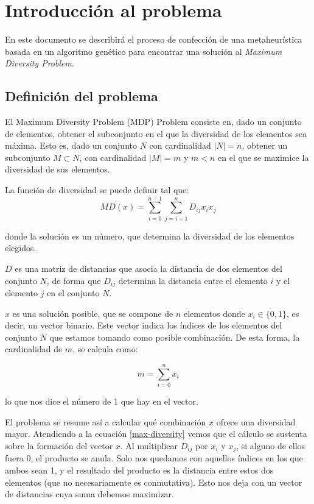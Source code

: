 \chapter{Introducción al problema}

En este documento se describirá el proceso de confección de una metaheurística basada en un algoritmo genético para encontrar una solución al \textit{Maximum Diversity Problem}.

\section{Definición del problema}
El Maximum Diversity Problem (MDP) Problem consiste en, dado un conjunto de elementos, obtener el subconjunto en el que la diversidad de los elementos sea máxima. Esto es, dado un conjunto $N$ con cardinalidad $|N| = n$, obtener un subconjunto $M \subset N$, con cardinalidad $|M| = m$ y $m < n$ en el que se maximice la diversidad de sus elementos.

La función de diversidad se puede definir tal que:
\begin{equation}
    MD(x) = \sum^{n-1}_{i=0} \sum^{n}_{j=i+1} D_{ij}x_ix_j
\label{max-diversity}
\end{equation}

donde la solución es un número, que determina la diversidad de los elementos elegidos.

$D$ es una matriz de distancias que asocia la distancia de dos elementos del conjunto $N$, de forma que $D_{ij}$ determina la distancia entre el elemento $i$ y el elemento $j$ en el conjunto $N$.

$x$ es una solución posible, que se compone de $n$ elementos donde $x_i \in \{0, 1\}$, es decir, un vector binario. Este vector indica los índices de los elementos del conjunto $N$ que estamos tomando como posible combinación. De esta forma, la cardinalidad de $m$, se calcula como: 

\begin{equation}
    m = \sum_{i=0}^n x_i 
    \label{eq:sum_m}
\end{equation}

lo que nos dice el número de 1 que hay en el vector.

El problema se resume así a calcular qué combinación $x$ ofrece una diversidad mayor. Atendiendo a la ecuación \ref{max-diversity} vemos que el cálculo se sustenta sobre la formación del vector $x$. Al multiplicar $D_{ij}$ por $x_i$ y $x_j$, si alguno de ellos fuera 0, el producto se anula. Solo nos quedamos con aquellos índices en los que ambos sean 1, y el resultado del producto es la distancia entre estos dos elementos (que no necesariamente es conmutativa). Esto nos deja con un vector de distancias cuya suma debemos maximizar.


